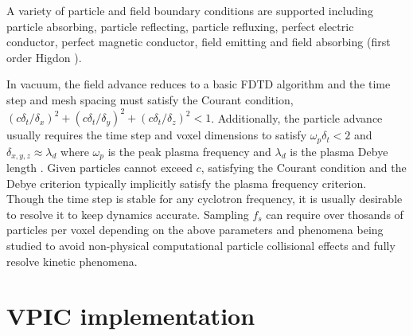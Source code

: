 \documentclass[10pt]{article}
\begin{document}
A variety of particle and field boundary conditions are supported
including particle absorbing, particle reflecting, particle refluxing,
perfect electric conductor, perfect magnetic conductor, field emitting
and field absorbing (first order Higdon \cite{Higdon_1986}).

In vacuum, the field advance reduces to a basic FDTD algorithm
\cite{Yee_1966} and the time step and mesh spacing must satisfy the
Courant condition,
$\left(c\delta_t/\delta_x\right)^2 +
 \left(c\delta_t/\delta_y\right)^2 +
 \left(c\delta_t/\delta_z\right)^2 < 1$.
Additionally, the particle advance usually requires the time step and
voxel dimensions to satisfy $\omega_p \delta_t < 2$ and $\delta_{x,y,z}
\approx \lambda_d$ where $\omega_p$ is the peak plasma frequency and
$\lambda_d$ is the plasma Debye length
\cite{Birdsall_Langdon_1985,Hockney_Eastwood_1988}.
Given particles cannot exceed $c$, satisfying the Courant condition
and the Debye criterion typically implicitly satisfy the plasma
frequency criterion.  Though the time step is stable for any cyclotron
frequency, it is usually desirable to resolve it to keep dynamics
accurate.  Sampling $f_s$ can require over thosands of particles per
voxel depending on the above parameters and phenomena being studied to
avoid non-physical computational particle collisional effects and
fully resolve kinetic phenomena.

\section{VPIC implementation}
\end{document}
